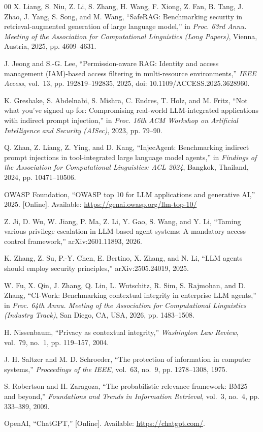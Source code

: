 \documentclass[conference]{IEEEtran}
\begin{document}
\begin{thebibliography}{00}
X. Liang, S. Niu, Z. Li, S. Zhang, H. Wang, F. Xiong, Z. Fan, B. Tang, J. Zhao, J. Yang, S. Song, and M. Wang, ``SafeRAG: Benchmarking security in retrieval-augmented generation of large language model,'' in \emph{Proc. 63rd Annu. Meeting of the Association for Computational Linguistics (Long Papers)}, Vienna, Austria, 2025, pp. 4609--4631.

J. Jeong and S.-G. Lee, ``Permission-aware RAG: Identity and access management (IAM)-based access filtering in multi-resource environments,'' \emph{IEEE Access}, vol.~13, pp. 192819--192835, 2025, doi: 10.1109/ACCESS.2025.3628960.

K. Greshake, S. Abdelnabi, S. Mishra, C. Endres, T. Holz, and M. Fritz, ``Not what you've signed up for: Compromising real-world LLM-integrated applications with indirect prompt injection,'' in \emph{Proc. 16th ACM Workshop on Artificial Intelligence and Security (AISec)}, 2023, pp. 79--90.

Q. Zhan, Z. Liang, Z. Ying, and D. Kang, ``InjecAgent: Benchmarking indirect prompt injections in tool-integrated large language model agents,'' in \emph{Findings of the Association for Computational Linguistics: ACL 2024}, Bangkok, Thailand, 2024, pp. 10471--10506.

OWASP Foundation, ``OWASP top 10 for LLM applications and generative AI,'' 2025. [Online]. Available: \url{https://genai.owasp.org/llm-top-10/}

Z. Ji, D. Wu, W. Jiang, P. Ma, Z. Li, Y. Gao, S. Wang, and Y. Li, ``Taming various privilege escalation in LLM-based agent systems: A mandatory access control framework,'' arXiv:2601.11893, 2026.

K. Zhang, Z. Su, P.-Y. Chen, E. Bertino, X. Zhang, and N. Li, ``LLM agents should employ security principles,'' arXiv:2505.24019, 2025.

W. Fu, X. Qin, J. Zhang, Q. Lin, L. Wutschitz, R. Sim, S. Rajmohan, and D. Zhang, ``CI-Work: Benchmarking contextual integrity in enterprise LLM agents,'' in \emph{Proc. 64th Annu. Meeting of the Association for Computational Linguistics (Industry Track)}, San Diego, CA, USA, 2026, pp. 1483--1508.

H. Nissenbaum, ``Privacy as contextual integrity,'' \emph{Washington Law Review}, vol.~79, no.~1, pp. 119--157, 2004.

J. H. Saltzer and M. D. Schroeder, ``The protection of information in computer systems,'' \emph{Proceedings of the IEEE}, vol.~63, no.~9, pp. 1278--1308, 1975.

S. Robertson and H. Zaragoza, ``The probabilistic relevance framework: BM25 and beyond,'' \emph{Foundations and Trends in Information Retrieval}, vol.~3, no.~4, pp. 333--389, 2009.

OpenAI, ``ChatGPT,'' [Online]. Available: \url{https://chatgpt.com/}.

\end{thebibliography}
\end{document}
